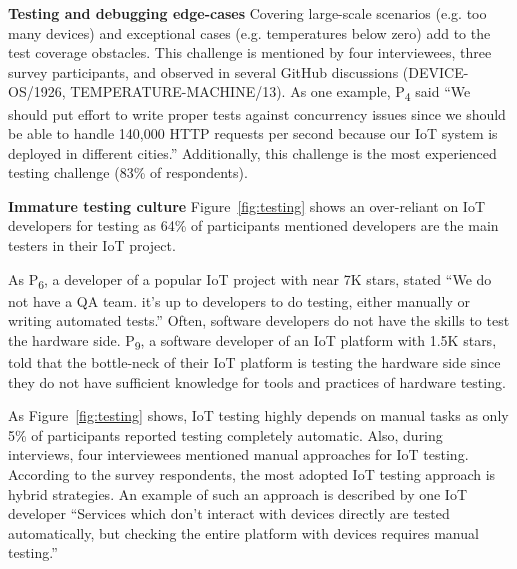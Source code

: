 \textbf{Testing and debugging edge-cases}
Covering large-scale scenarios (e.g. too many devices) and exceptional cases (e.g. temperatures below zero) add to the test coverage obstacles. This challenge is mentioned by four interviewees, three survey participants, and observed in several GitHub discussions (DEVICE-OS/1926, TEMPERATURE-MACHINE/13). As one example, P\textsubscript{4} said \enquote{We should put effort to write proper tests against concurrency issues since we should be able to handle 140,000 HTTP requests per second because our IoT system is deployed in different cities.} Additionally, this challenge is the most experienced testing challenge (83\% of respondents). 

\textbf{Immature testing culture}
Figure~\ref{fig:testing} shows an over-reliant on IoT developers for testing as 64\% of participants mentioned developers are the main testers in their IoT project.


As P\textsubscript{6}, a developer of a popular IoT project with near 7K stars, stated \enquote{We do not have a QA team. it's up to developers to do testing, either manually or writing automated tests.} Often, software developers do not have the skills to test the hardware side. P\textsubscript{9}, a software developer of an IoT platform with 1.5K stars, told that the bottle-neck of their IoT platform is testing the hardware side since they do not have sufficient knowledge for tools and practices of hardware testing.


As Figure~\ref{fig:testing} shows, IoT testing highly depends on manual tasks as only 5\% of participants reported testing completely automatic. Also, during interviews, four interviewees mentioned manual approaches for IoT testing. According to the survey respondents, the most adopted IoT testing approach is hybrid strategies. An example of such an approach is described by one IoT developer \enquote{Services which don't interact with devices directly are tested automatically, but checking the entire platform with devices requires manual testing.} 



